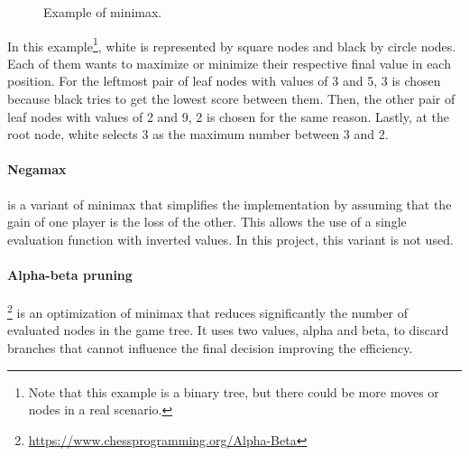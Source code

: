\begin{figure}[H]
    \centering
    \caption{Example of minimax.}
    \label{fig:minimax}
\end{figure}

In this example\footnote{Note that this example is a binary tree, but there could be more moves or nodes in a real scenario.}, white is represented by square nodes and black by circle nodes. Each of them wants to maximize or minimize their respective final value in each position. For the leftmost pair of leaf nodes with values of 3 and 5, 3 is chosen because black tries to get the lowest score between them. Then, the other pair of leaf nodes with values of 2 and 9, 2 is chosen for the same reason. Lastly, at the root node, white selects 3 as the maximum number between 3 and 2.

\paragraph{Negamax} is a variant of minimax that simplifies the implementation by assuming that the gain of one player is the loss of the other. This allows the use of a single evaluation function with inverted values. In this project, this variant is not used.

\paragraph{Alpha-beta pruning}\footnote{\url{https://www.chessprogramming.org/Alpha-Beta}} is an optimization of minimax that reduces significantly the number of evaluated nodes in the game tree. It uses two values, alpha and beta, to discard branches that cannot influence the final decision improving the efficiency.

